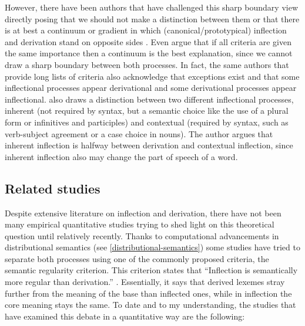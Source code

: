 \documentclass[12pt]{article}
\begin{document}
However, there have been authors that have challenged this sharp boundary view directly posing that we should not make a distinction between them \parencite{haspelmath2024InflectionDerivationTraditional} or that there is at best a continuum or gradient in which (canonical/prototypical) inflection and derivation stand on opposite sides \parencite{bybee1985MorphologyStudyRelation, stekauer2015DelimitationDerivationInflection}. Even \textcite{haspelmath2013UnderstandingMorphology} argue that if all criteria are given the same importance then a continuum is the best explanation, since we cannot draw a sharp boundary between both processes. In fact, the same authors that provide long lists of criteria also acknowledge that exceptions exist and that some inflectional processes appear derivational and some derivational processes appear inflectional. \textcite{booij2006InflectionDerivation} also draws a distinction between two different inflectional processes, inherent (not required by syntax, but a semantic choice like the use of a plural form or infinitives and participles) and contextual (required by syntax, such as verb-subject agreement or a case choice in nouns). The author argues that inherent inflection is halfway between derivation and contextual inflection, since inherent inflection also may change the part of speech of a word.

\subsection{Related studies}
Despite extensive literature on inflection and derivation, there have not been many empirical quantitative studies trying to shed light on this theoretical question until relatively recently. Thanks to computational advancements in distributional semantics (see \autoref{distributional-semantics}) some studies have tried to separate both processes using one of the commonly proposed criteria, the semantic regularity criterion. This criterion states that \enquote{Inflection is semantically more regular than derivation.} \parencite{stump2005WordFormationInflectionalMorphology}. Essentially, it says that derived lexemes stray further from the meaning of the base than inflected ones, while in inflection the core meaning stays the same. To date and to my understanding, the studies that have examined this debate in a quantitative way are the following:
\end{document}

